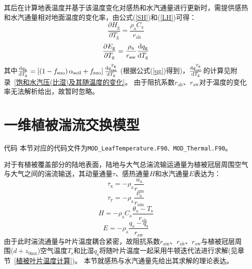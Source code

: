 其后在计算地表温度并基于该温度变化对感热和水汽通量进行更新时，需提供感热和水汽通量相对地面温度的变化率，由公式(\ref{SH})和(\ref{LH})可得：
\begin{equation}
  \frac{\partial H_{\mathrm{g}}}{\partial T_{\mathrm{g}}}=\frac{\rho_{\mathrm{a}} C_{\mathrm{a}}}{r_{\mathrm{a h}}}
\end{equation}
\begin{equation}\label{Eg/Tg_1}
  \frac{\partial E_{\mathrm{g}}}{\partial T_{\mathrm{g}}}= \frac{\rho_{\mathrm{a}}}{r_{\mathrm{a w}}} \frac{{\rm d} q_{\mathrm{g}}}{{\rm d} T_{\mathrm{g}}}
\end{equation}
其中$\frac{{\rm d}q_{\mathrm {g}}}{{\rm d}T_{\mathrm {g}}}=\left[\left(1-f_{\mathrm{sno}}\right)\alpha_{\mathrm{soil}}+f_{\mathrm{sno}}\right]\frac{{\rm d}q_{\mathrm{sat}}^{T_{\mathrm {g}}}}{{\rm d}T_{\mathrm {g}}}$ (根据公式(\ref{qg})得到)，$\frac{{\rm d}q_{\mathrm{sat}}^{T_{\mathrm {g}}}}{{\rm d}T_{\mathrm {g}}}$的计算见附录~\ref{饱和水汽压(比湿)及其随温度的变化}。
由于阻抗系数$r_{\mathrm{ah}}$、$r_{\mathrm{aw}}$对于温度的变化率无法解析给出，故暂时忽略。


\section{一维植被湍流交换模型}\label{一维植被湍流交换模型}
\begin{mymdframed}{代码}
  本节对应的代码文件为\texttt{MOD\_LeafTemperature.F90、MOD\_Thermal.F90}。
\end{mymdframed}

对于有植被覆盖部分的陆地表面，陆地与大气总湍流输运通量为植被冠层周围空气与大气之间的湍流输送，其动量通量$\tau$、感热通量$H$和水汽通量$E$表达为：
\begin{equation}
  \tau_{\mathrm{x}}=-\rho_{\mathrm{a}} \frac{u_{\mathrm{a}}}{r_{\mathrm{a m}}}
\end{equation}
\begin{equation}
  \tau_{\mathrm{y}}=-\rho_{\mathrm{a}} \frac{v_{\mathrm{a}}}{r_{\mathrm{a m}}}
\end{equation}
\begin{equation}
  H=-\rho_{\mathrm{a}} C_{\mathrm{a}} \frac{\theta_{\mathrm{a}}-T_{\mathrm{s}}}{r_{\mathrm{a h}}}
\end{equation}
\begin{equation}
  E=-\rho_{\mathrm{a}} \frac{q_{\mathrm{a}}-q_{\mathrm{s}}}{r_{\mathrm{a w}}}
\end{equation}
由于此时湍流通量与叶片温度耦合紧密，故阻抗系数$r_{\mathrm{am}}$、$r_{\mathrm{ah}}$、$r_{\mathrm{aw}}$与植被冠层周围($d+z_{\mathrm{0mx}}$)空气温度$T_{\mathrm {s}}$和比湿$q_{\mathrm {s}}$将随叶片温度一起采用牛顿迭代法进行求解(见章节~\ref{植被叶片温度计算})。
本节就感热与水汽通量先给出其求解的理论表达。



